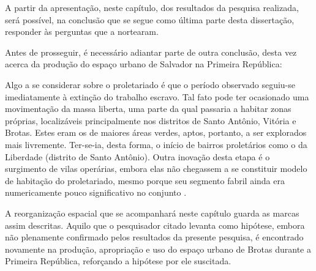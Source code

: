 A partir da apresentação, neste capítulo, dos resultados da pesquisa realizada, será possível, na conclusão que se segue como última parte desta dissertação, responder às perguntas que a nortearam.

Antes de prosseguir, é necessário adiantar parte de outra conclusão, desta vez acerca da produção do espaço urbano de Salvador na Primeira República:

\begin{citacao}
Algo a se considerar sobre o proletariado é que o período observado seguiu-se imediatamente à extinção do trabalho escravo. Tal fato pode ter ocasionado uma movimentação da massa liberta, uma parte da qual passaria a habitar zonas próprias, localizáveis principalmente nos distritos de Santo Antônio, Vitória e Brotas. Estes eram os de maiores áreas verdes, aptos, portanto, a ser explorados mais livremente. Ter-se-ia, desta forma, o início de bairros proletários como o da Liberdade (distrito de Santo Antônio). Outra inovação desta etapa é o surgimento de vilas operárias, embora elas não chegassem a se constituir modelo de habitação do proletariado, mesmo porque seu segmento fabril ainda era numericamente pouco significativo no conjunto \cite[pp.~21-22]{santos_habitacao_1990}.
\end{citacao}

A reorganização espacial que se acompanhará neste capítulo guarda as marcas assim descritas. Aquilo que o pesquisador citado levanta como hipótese, embora não plenamente confirmado pelos resultados da presente pesquisa, é encontrado novamente na produção, apropriação e uso do espaço urbano de Brotas durante a Primeira República, reforçando a hipótese por ele suscitada.



% 
